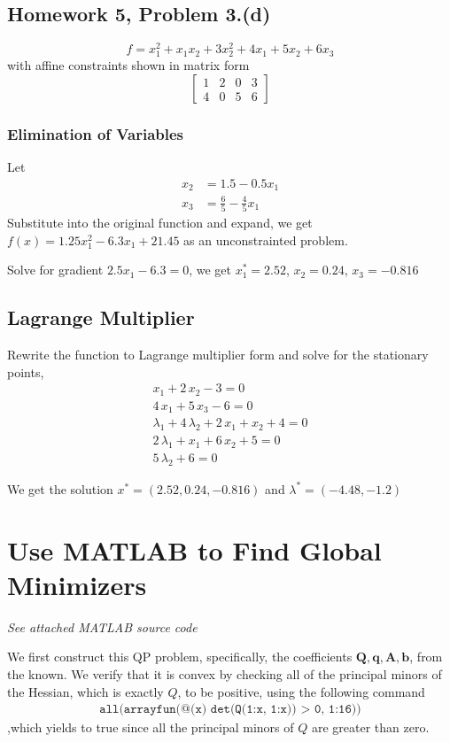 \subsection{Homework 5, Problem 3.(d)}

\[
f = x_1^2 + x_1 x_2 + 3x_2^2 + 4x_1 + 5x_2 + 6x_3
\]
with affine constraints shown in matrix form
\[
\left[
\begin{array}{ccc|c}
     1 &  2 & 0 & 3 \\
     4 & 0 & 5 & 6
\end{array}
\right]
\]

\subsubsection{Elimination of Variables}
Let
\begin{align*}
x_2 &= 1.5 - 0.5x_1 \\
x_3 &= \frac{6}{5} - \frac{4}{5}x_1
\end{align*}
Substitute into the original function and expand, we get
$f(x) = 1.25x_1^2 -6.3x_1 + 21.45$ as an unconstrainted problem.

Solve for gradient $2.5x_1 -6.3 = 0$, we get $x_1^*=2.52$, $x_2 = 0.24$, $x_3 = -0.816$

\subsection{Lagrange Multiplier}
Rewrite the function to Lagrange multiplier form and solve for the stationary points,
\begin{align*}
    x_1 +2\,x_2 -3 = 0\\
4\,x_1 +5\,x_3 -6 = 0\\
\lambda_1 +4\,\lambda_2 +2\,x_1 +x_2 +4 = 0\\
2\,\lambda_1 +x_1 +6\,x_2 +5= 0\\
5\,\lambda_2 +6 = 0
\end{align*}

We get the solution $x^* = (2.52, 0.24, -0.816)$ and $\lambda^* = (-4.48, -1.2)$

\section{Use MATLAB to Find Global Minimizers}
\textit{See attached MATLAB source code}
\par We first construct this QP problem, specifically, the coefficients $\mathbf{Q, q, A, b}$, from the known. We verify that it is convex by checking all of the principal minors of the Hessian, which is exactly $Q$, to be positive, using the following command
\begin{align*}
\texttt{all(arrayfun(@(x) det(Q(1:x, 1:x)) > 0, 1:16))}
\end{align*}
,which yields to true since all the principal minors of $Q$ are greater than zero.

